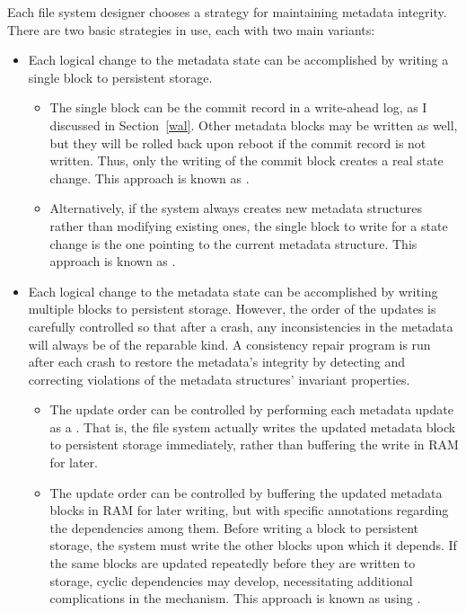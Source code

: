 Each file system designer chooses a strategy for maintaining metadata
integrity.  There are two basic strategies in use, each with two main
variants:
\begin{itemize}
\item
Each logical change to the metadata state can be accomplished by
writing a single block to persistent storage.
\begin{itemize}
\item
The single block can be the commit record in a write-ahead log, as I
discussed in Section~\ref{wal}.  Other metadata blocks may be written
as well, but they will be rolled back upon reboot if the commit record
is not written.  Thus, only the writing of the commit block creates a
real state change.  This approach is known as .
\item
Alternatively, if the system always creates new metadata structures rather than
modifying existing ones, the single block to write for a state change
is the one pointing to the current metadata structure.  This approach
is known as
.
\end{itemize}
\item
Each logical change to the metadata state can be accomplished by
writing multiple blocks to persistent storage. However, the order of the updates is
carefully controlled so that after a crash, any inconsistencies in the
metadata will always be of the reparable kind.   A
consistency repair program is run after each crash to restore
the metadata's integrity by detecting and correcting violations of the
metadata structures' invariant properties.
\begin{itemize}
\item
The update order can be controlled by performing each metadata update
as a .  That is, the file system
actually writes the updated metadata block to persistent storage immediately, rather
than buffering the write in RAM for later.
\item
The update order can be controlled by buffering the updated
metadata blocks in RAM for later writing, but with specific
annotations regarding the dependencies among them.  Before writing a block
to persistent storage, the system must write the other blocks upon which it depends.  If the same
blocks are updated repeatedly before they are written to storage, cyclic
dependencies may develop, necessitating additional complications in
the mechanism.  This approach is known as using
.
\end{itemize}
\end{itemize}

